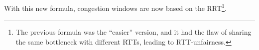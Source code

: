 With this new formula, congestion windows are now based on the RRT\footnote{
  The previous formula was the ``easier'' version, and it had the flaw of sharing the same bottleneck with different RTTs, leading to RTT-unfairness.
}.

\begin{table}[t]
\centering
{}
\caption{Comparison between different TCP version}
\label{tab:WMAC:SAP-LAWComparison}
\end{table}
